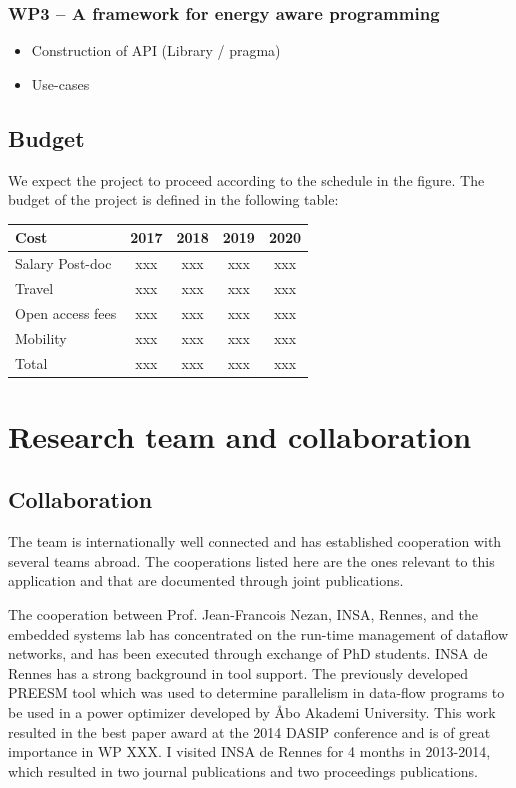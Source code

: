 \documentclass{article}
\begin{document}
\subsubsection{WP3 -- A framework for energy aware programming}
\begin{itemize}
 \item Construction of API (Library / pragma)
 \item Use-cases
\end{itemize}


\subsection{Budget}
We expect the project to proceed according to the schedule in the figure.
The budget of the project is defined in the following table:
\begin{table}[h]
\begin{center}
\begin{tabular}{ | l | c | c |c |c |}
\hline
{Cost} & {2017} & {2018} & {2019} & {2020} \\ \hline
{Salary Post-doc} & xxx & xxx & xxx & xxx \\ \hline
{Travel} & xxx & xxx & xxx & xxx  \\ \hline
{Open access fees} & xxx & xxx & xxx & xxx  \\ \hline
{Mobility} & xxx & xxx & xxx & xxx  \\ \hline
{Total} & xxx & xxx & xxx & xxx  \\ \hline
\end{tabular}
\label{tab:strconf}
\end{center}

\end{table}

\section{Research team and collaboration}

\subsection{Collaboration}
The team is internationally well connected and has established cooperation with several teams abroad. 
The cooperations listed here are the ones relevant to this application and that are documented through joint publications.

The cooperation between Prof. Jean-Francois Nezan, INSA, Rennes, and the embedded systems lab has concentrated on the run-time management of dataflow networks, 
and has been executed through exchange of PhD students.
INSA de Rennes has a strong background in tool support. 
The previously developed PREESM tool which was used to determine parallelism in data-flow programs to be used in a power optimizer developed by \AA{}bo Akademi University.
This work resulted in the best paper award at the 2014 DASIP conference and is of great importance in WP XXX.
I visited INSA de Rennes for 4 months in 2013-2014, which resulted in two journal publications and two proceedings publications.
\end{document}
